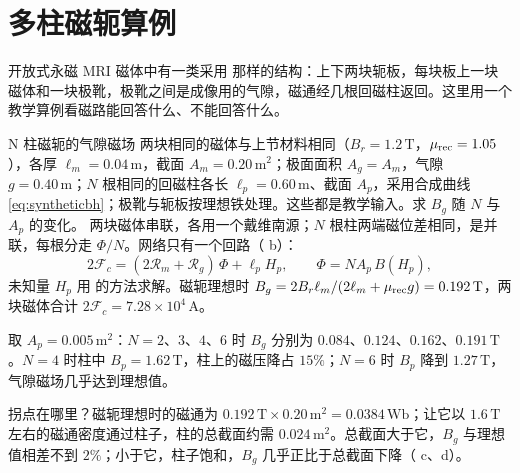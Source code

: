 \section{多柱磁轭算例}\label{sec:lumped-multipillar}

开放式永磁 MRI 磁体中有一类采用 那样的结构：上下两块轭板，每块板上一块磁体和一块极靴，极靴之间是成像用的气隙，磁通经几根回磁柱返回。这里用一个教学算例看磁路能回答什么、不能回答什么。


\begin{example}[label=ex:lumped-pillars]{N 柱磁轭的气隙磁场}
两块相同的磁体与上节材料相同（$B_r=1.2\,\mathrm T$，$\mu_{\rm rec}=1.05$），各厚 $\ell_m=0.04\,\mathrm m$，截面 $A_m=0.20\,\mathrm{m^2}$；极面面积 $A_g=A_m$，气隙 $g=0.40\,\mathrm m$；$N$ 根相同的回磁柱各长 $\ell_p=0.60\,\mathrm m$、截面 $A_p$，采用合成曲线 \eqref{eq:syntheticbh}；极靴与轭板按理想铁处理。这些都是教学输入。求 $B_g$ 随 $N$ 与 $A_p$ 的变化。
\solution
两块磁体串联，各用一个戴维南源；$N$ 根柱两端磁位差相同，是并联，每根分走 $\Phi/N$。网络只有一个回路（ b）：
\begin{equation*}
2\mathcal F_c=(2\mathcal R_m+\mathcal R_g)\,\Phi+\ell_pH_p,\qquad \Phi=NA_p\,B(H_p),
\end{equation*}
未知量 $H_p$ 用 的方法求解。磁轭理想时 $B_g=2B_r\ell_m/(2\ell_m+\mu_{\rm rec}g)=0.192\,\mathrm T$，两块磁体合计 $2\mathcal F_c=7.28\times10^4\,\mathrm A$。

取 $A_p=0.005\,\mathrm{m^2}$：$N=2$、$3$、$4$、$6$ 时 $B_g$ 分别为 $0.084$、$0.124$、$0.162$、$0.191\,\mathrm T$。$N=4$ 时柱中 $B_p=1.62\,\mathrm T$，柱上的磁压降占 $15\%$；$N=6$ 时 $B_p$ 降到 $1.27\,\mathrm T$，气隙磁场几乎达到理想值。

拐点在哪里？磁轭理想时的磁通为 $0.192\,\mathrm T\times0.20\,\mathrm{m^2}=0.0384\,\mathrm{Wb}$；让它以 $1.6\,\mathrm T$ 左右的磁通密度通过柱子，柱的总截面约需 $0.024\,\mathrm{m^2}$。总截面大于它，$B_g$ 与理想值相差不到 $2\%$；小于它，柱子饱和，$B_g$ 几乎正比于总截面下降（ c、d）。
\end{example}


